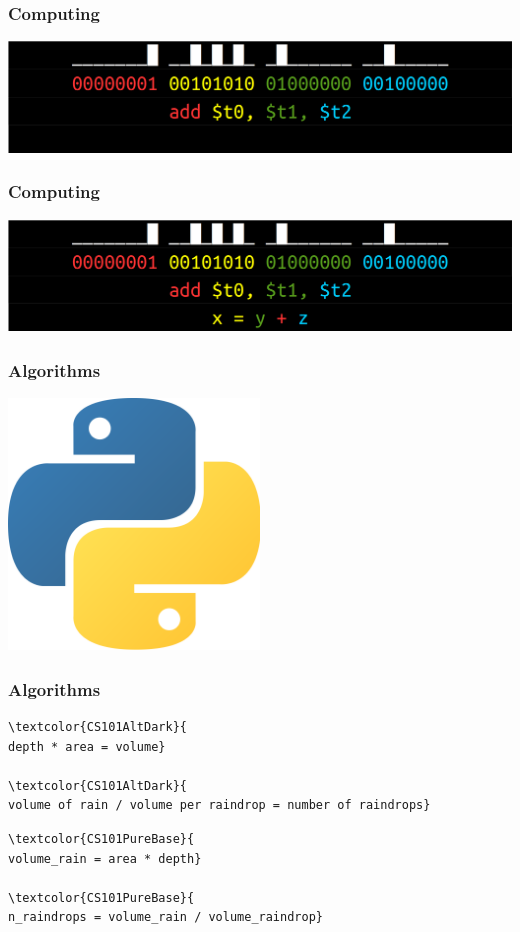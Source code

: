 \documentclass[11pt]{beamer}
\begin{document}
\begin{frame}[fragile]
  \frametitle{Computing}

  \includegraphics[width=\textwidth]{./img/assembler-3.png}
\end{frame}

\begin{frame}[fragile]
  \frametitle{Computing}

  \includegraphics[width=\textwidth]{./img/assembler-4.png}
\end{frame}

\begin{frame}[fragile]
  \frametitle{Algorithms}

  \begin{centering}
  \includegraphics[width=0.5\textwidth]{./img/python-logo.png}
  \end{centering}
\end{frame}

\begin{frame}[fragile]
  \frametitle{Algorithms}
  \Enlarge
  \begin{Verbatim}
\textcolor{CS101AltDark}{
depth * area = volume}

\textcolor{CS101AltDark}{
volume of rain / volume per raindrop = number of raindrops}
  \end{Verbatim}
  \begin{Verbatim}
\textcolor{CS101PureBase}{
volume_rain = area * depth}

\textcolor{CS101PureBase}{
n_raindrops = volume_rain / volume_raindrop}
  \end{Verbatim}
\end{frame}
\end{document}

